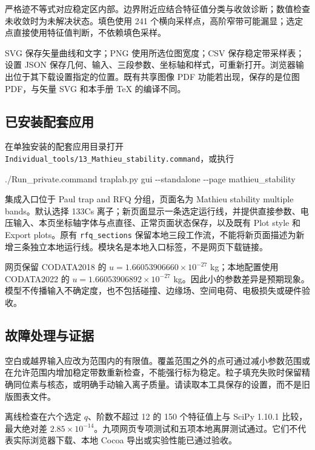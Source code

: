\documentclass[
  aps,
  onecolumn,
  11pt]{revtex4-2}
\newenvironment{Shaded}{}{}
\newcommand{\AttributeTok}[1]{\textcolor[rgb]{0.49,0.56,0.16}{#1}}
\newcommand{\ExtensionTok}[1]{#1}
\newcommand{\NormalTok}[1]{#1}
\begin{document}
严格迹不等式对应稳定区内部。边界附近应结合特征值分类与收敛诊断；数值检查未收敛时为未解决状态。填色使用
241
个横向采样点，高阶窄带可能漏显；选定点直接使用特征值判断，不依赖填色采样。

SVG 保存矢量曲线和文字；PNG 使用所选位图宽度；CSV 保存稳定带采样表；设置
JSON
保存几何、输入、三段参数、坐标轴和样式，可重新打开。浏览器输出位于其下载设置指定的位置。既有共享图像
PDF 功能若出现，保存的是位图 PDF，与矢量 SVG 和本手册 TeX 的编译不同。

\subsection{已安装配套应用}\label{ux5df2ux5b89ux88c5ux914dux5957ux5e94ux7528}

在单独安装的配套应用目录打开
\texttt{Individual\_tools/13\_Mathieu\_stability.command}，或执行

\begin{Shaded}
\begin{Highlighting}[]
\ExtensionTok{./Run\_private.command}\NormalTok{ traplab.py gui }\AttributeTok{{-}{-}standalone} \AttributeTok{{-}{-}page}\NormalTok{ mathieu\_stability}
\end{Highlighting}
\end{Shaded}

集成入口位于 Paul trap and RFQ 分组，页面名为 Mathieu stability multiple
bands。默认选择 133Cs
离子；新页面显示一条选定运行线，并提供直接参数、电压输入、本页坐标轴字体与点直径、正常页面状态保存，以及既有
Plot style 和 Export plots。原有 \texttt{rfq\_sections}
保留本地三段工作流，不能将新页面描述为新增三条独立本地运行线。模块名是本地入口标签，不是网页下载链接。

网页保留 CODATA2018 的 \(u=1.66053906660\times10^{-27}\)
kg；本地配置使用 CODATA2022 的 \(u=1.66053906892\times10^{-27}\)
kg。因此小的参数差异是预期现象。模型不传播输入不确定度，也不包括碰撞、边缘场、空间电荷、电极损失或硬件验收。

\subsection{故障处理与证据}\label{ux6545ux969cux5904ux7406ux4e0eux8bc1ux636e}

空白或越界输入应改为范围内的有限值。覆盖范围之外的点可通过减小参数范围或在允许范围内增加稳定带数重新检查，不能强行标为稳定。粒子填充失败时保留精确同位素与核态，或明确手动输入离子质量。请读取本工具保存的设置，而不是旧版图表文件。

离线检查在六个选定 \(q\)、阶数不超过 12 的 150 个特征值上与 SciPy 1.10.1
比较，最大绝对差
\(2.85\times10^{-14}\)。九项网页专项测试和五项本地离屏测试通过。它们不代表实际浏览器下载、本地
Cocoa 导出或实验性能已通过验收。
\end{document}
